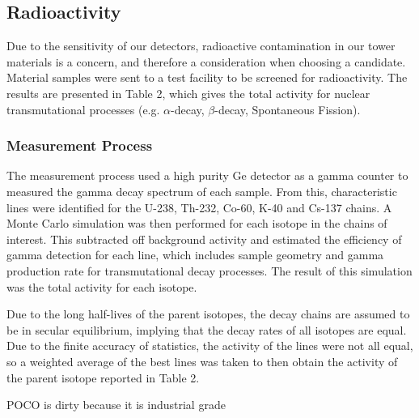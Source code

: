 \documentclass{report}
\begin{document}
\begin{multicols}{2}
\subsection{Radioactivity}

Due to the sensitivity of our detectors, radioactive contamination in our tower
materials is a concern, and therefore a consideration when choosing a candidate.
Material samples were sent to a test facility to be screened for radioactivity.
The results are presented in Table 2, which gives the total activity for nuclear
transmutational processes (e.g. $\alpha$-decay, $\beta$-decay, Spontaneous Fission).

\subsubsection{Measurement Process}
The measurement process used a high purity Ge detector as a gamma counter to measured the
gamma decay spectrum of each sample. From this, characteristic lines were identified for
the U-238, Th-232, Co-60, K-40 and Cs-137 chains. A Monte Carlo simulation was then
performed for each isotope in the chains of interest. This subtracted off background
activity and estimated the efficiency of gamma detection for each line, which includes
sample geometry and gamma production rate for transmutational decay processes. The result
of this simulation was the total activity for each isotope.

Due to the long half-lives of the parent isotopes, the decay chains are assumed to be in
secular equilibrium, implying that the decay rates of all isotopes are equal. Due to the
finite accuracy of statistics, the activity of the lines were not all equal, so a weighted
average of the best lines was taken to then obtain the activity of the parent isotope
reported in Table 2.


POCO is dirty because it is industrial grade


\end{multicols}
\end{document}
